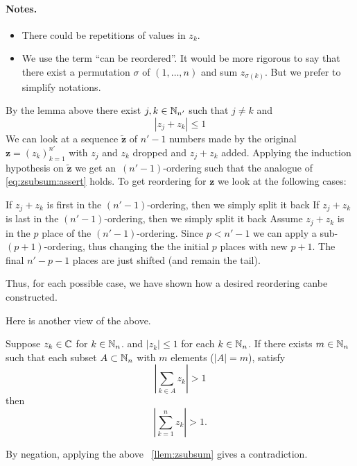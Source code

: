 \paragraph{Notes.} 
\begin{itemize}
\item There could be repetitions of values in \(z_k\).
\item
We use the term ``can be reordered''.
It would be more rigorous to say that
there exist a permutation \(\sigma\) of \((1,\ldots,n)\) 
and sum \(z_{\sigma(k)}\). But we prefer to simplify notations.
\end{itemize}

\begin{thmproof}
By the lemma above there exist  \(j,k\in\mathbb{N}_{n'}\) such that \(j\neq k\) and
\begin{equation} \label{eq:zsubsum:zjzk}
 |z_j + z_k| \leq 1 
\end{equation}
We can look at a sequence
\(\tilde{\mathbf{z}}\) 
of \(n'-1\) numbers
made by the original \(\mathbf{z}=(z_k)_{k=1}^{n'}\) 
with \(z_j\) and \(z_k\) dropped
and \(z_j + z_k\) added. Applying the induction hypothesis on
\(\tilde{\mathbf{z}}\) we get an~\((n'-1)\)-ordering
such that the analogue of \eqref{eq:zsubsum:assert} holds.
To get reordering for \(\mathbf{z}\)
we look at the following cases:
\begin{itemize}
  If \(z_j+z_k\) is first in the \((n'-1)\)-ordering,
 then we simply split it back
  If \(z_j+z_k\) is last in the \((n'-1)\)-ordering,
 then we simply split it back
  Assume \(z_j+z_k\) is in the $p$ place of the \((n'-1)\)-ordering.
 Since \(p<n'-1\) we can apply a sub-\((p+1)\)-ordering,
 thus changing the the initial $p$ places with new \(p+1\).
 The final \(n'-p-1\) places are just shifted (and remain the tail).
\end{itemize}
Thus, for each possible case, we have shown how a desired reordering
canbe constructed.
\end{thmproof}

Here is another view of the above.
\begin{llem} \label{llem:zsub:block}
Suppose \(z_k\in\mathbb{C}\) for \(k\in\mathbb{N}_n\). %
and \(|z_k| \leq 1\) for each \(k\in \mathbb{N}_n\).
If there exists \(m\in\mathbb{N}_n\) such that each subset \(A\subset\mathbb{N}_n\)
with $m$ elements (\(|A|=m\)), satisfy
\begin{equation*}
\left|\sum_{k\in A} z_k\right| > 1
\end{equation*}
then 
\begin{equation*}
\left|\sum_{k=1}^n z_k\right| > 1.
\end{equation*}
\end{llem}
\begin{thmproof}
By negation, applying the above \loclemma~\ref{llem:zsubsum} gives
a contradiction.
\end{thmproof}

